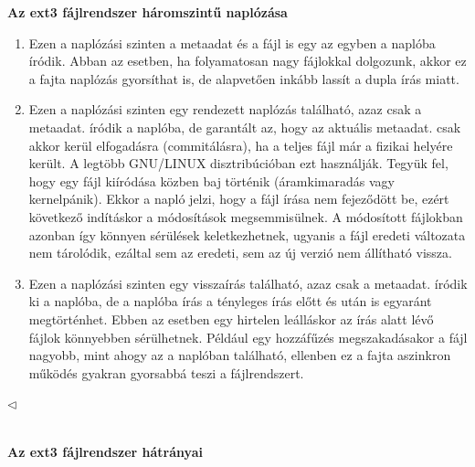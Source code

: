 \documentclass[tikz,12pt,margin=0px]{article}
\begin{document}
    {\footnotesize \noindent {\color{blue} \faLightbulbO\ $\triangleright$ } }
    {\footnotesize
    \noindent \textbf{Az ext3 fájlrendszer háromszintű naplózása}

    \begin{enumerate}[topsep=8pt,itemsep=4pt,partopsep=4pt, parsep=4pt]
        \item Ezen a naplózási szinten a metaadat és a fájl is egy az egyben a naplóba íródik. Abban az esetben, ha folyamatosan nagy fájlokkal dolgozunk, akkor ez a fajta naplózás gyorsíthat is, de alapvetően inkább lassít a dupla írás miatt.

        \item Ezen a naplózási szinten egy rendezett naplózás található, azaz csak a metaadat. íródik a naplóba, de garantált az, hogy az aktuális metaadat. csak akkor kerül elfogadásra (commitálásra), ha a teljes fájl már a fizikai helyére került. A legtöbb GNU/LINUX disztribúcióban ezt használják. Tegyük fel, hogy egy fájl kiíródása közben baj történik (áramkimaradás vagy kernelpánik). Ekkor a napló jelzi, hogy a fájl írása nem fejeződött be, ezért következő indításkor a módosítások megsemmisülnek. A módosított fájlokban azonban így könnyen sérülések keletkezhetnek, ugyanis a fájl eredeti változata nem tárolódik, ezáltal sem az eredeti, sem az új verzió nem állítható vissza.

        \item Ezen a naplózási szinten egy visszaírás található, azaz csak a metaadat. íródik ki a naplóba, de a naplóba írás a tényleges írás előtt és után is egyaránt megtörténhet. Ebben az esetben egy hirtelen leálláskor az írás alatt lévő fájlok könnyebben sérülhetnek. Például egy hozzáfűzés megszakadásakor a fájl nagyobb, mint ahogy az a naplóban található, ellenben ez a fajta aszinkron működés gyakran gyorsabbá teszi a fájlrendszert.
    \end{enumerate}
    $\triangleleft$ \faLightbulbO}\\

    \noindent \textbf{Az ext3 fájlrendszer hátrányai\\}
\end{document}
